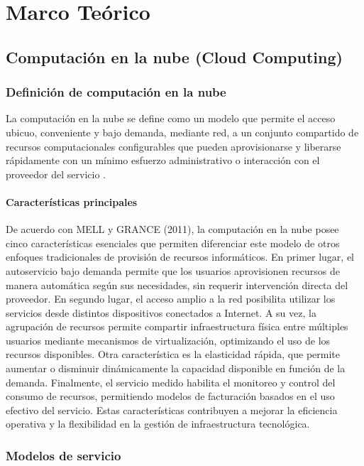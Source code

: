 \chapter{Marco Teórico}

\section{Computación en la nube (Cloud Computing)}

\subsection{Definición de computación en la nube}

La computación en la nube se define como un modelo que permite el acceso ubicuo, conveniente y bajo demanda, mediante red, a un conjunto compartido de recursos computacionales configurables que pueden aprovisionarse y liberarse rápidamente con un mínimo esfuerzo administrativo o interacción con el proveedor del servicio \parencite{Mell2011}.

\subsubsection{Características principales}

De acuerdo con MELL y GRANCE (2011), la computación en la nube posee cinco características esenciales que permiten diferenciar este modelo de otros enfoques tradicionales de provisión de recursos informáticos. En primer lugar, el autoservicio bajo demanda permite que los usuarios aprovisionen recursos de manera automática según sus necesidades, sin requerir intervención directa del proveedor. En segundo lugar, el acceso amplio a la red posibilita utilizar los servicios desde distintos dispositivos conectados a Internet. A su vez, la agrupación de recursos permite compartir infraestructura física entre múltiples usuarios mediante mecanismos de virtualización, optimizando el uso de los recursos disponibles. Otra característica es la elasticidad rápida, que permite aumentar o disminuir dinámicamente la capacidad disponible en función de la demanda. Finalmente, el servicio medido habilita el monitoreo y control del consumo de recursos, permitiendo modelos de facturación basados en el uso efectivo del servicio. Estas características contribuyen a mejorar la eficiencia operativa y la flexibilidad en la gestión de infraestructura tecnológica.

\subsection{Modelos de servicio}

